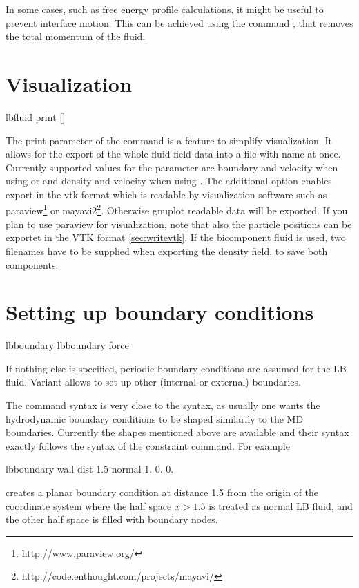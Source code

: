 In some cases, such as free energy profile calculations, it might be useful to prevent interface motion. This can be achieved using the command , that removes the total momentum of the fluid.


\section{Visualization}
\label{ssec:LBvisualization}
\begin{essyntax}
  lbfluid print    []
\end{essyntax}
The print parameter of the  command is a feature to simplify visualization. It allows for the export of the whole fluid field data into a 
file with name  at once. Currently supported values for the 
parameter  are boundary and velocity when using  or  and density and velocity when using . The additional option 
 enables export in the vtk format which is readable by visualization software such as paraview\footnote{http://www.paraview.org/} or mayavi2\footnote{http://code.enthought.com/projects/mayavi/}. Otherwise gnuplot readable data will be 
exported. If you plan to use paraview for visualization, note that also the 
particle positions can be exportet in the VTK format \ref{sec:writevtk}.
If the  bicomponent fluid is used, two filenames have to be supplied when exporting the density field, to save both components.

\section{Setting up boundary conditions\label{sec:lbboundary}}
\begin{essyntax}
   lbboundary   
   lbboundary force 
  \begin{features}
  \end{features}
\end{essyntax}

If nothing else is specified, periodic boundary conditions are assumed
for the LB fluid. Variant  allows to set up other (internal
or external) boundaries.

The  command syntax is very close to the
 syntax, as usually one wants the hydrodynamic
boundary conditions to be shaped similarily to the MD
boundaries. Currently the shapes mentioned above are available and
their syntax exactly follows the syntax of the constraint command. For
example
\begin{tclcode}
  lbboundary wall dist 1.5 normal 1. 0. 0. 
\end{tclcode}
creates a planar boundary condition at distance 1.5 from the origin of
the coordinate system where the half space $x>1.5$ is treated as
normal LB fluid, and the other half space is filled with boundary
nodes.

